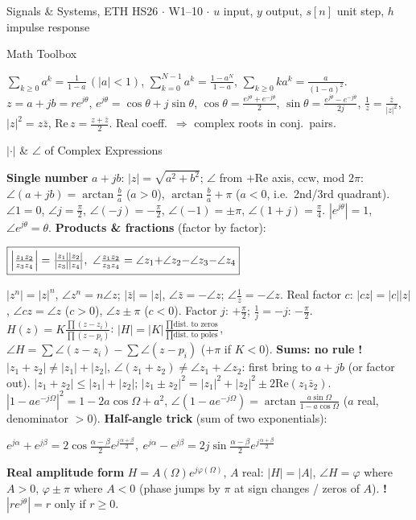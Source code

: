 \documentclass[a4paper,landscape]{article}
\newcommand{\sect}[1]{\par\vspace{1pt}\noindent\colorbox{secblue}{\parbox{\dimexpr\linewidth-2\fboxsep}{\color{white}\bfseries\fontsize{6.8}{7.6}\selectfont\strut #1}}\par\vspace{0.4pt}}
\newcommand{\sub}[1]{\par\vspace{0.6pt}\noindent\colorbox{subblue}{\parbox{\dimexpr\linewidth-2\fboxsep}{\bfseries\strut #1}}\par\vspace{0.2pt}}
\newcommand{\warn}[1]{{\color{warnred}\textbf{!}\,#1}}
\newcommand{\bx}[1]{\fbox{$\textstyle #1$}}
\newcommand{\eqc}[1]{\par\vspace{0.2pt}\centerline{$#1$}\par\vspace{0.2pt}}
\begin{document}
\fontsize{6.5}{7.3}\selectfont\raggedright\setlength{\lineskip}{0.2pt}\setlength{\lineskiplimit}{0pt}
\setlength{\abovedisplayskip}{0.6pt}\setlength{\belowdisplayskip}{0.6pt}
\setlength{\abovedisplayshortskip}{0.3pt}\setlength{\belowdisplayshortskip}{0.3pt}
\setlength{\jot}{0.2pt}
\begin{multicols*}{4}
{\fontsize{5.2}{5.8}\selectfont Signals \& Systems, ETH HS26 $\cdot$ W1--10 $\cdot$ $u$ input, $y$ output, $s[n]$ unit step, $h$ impulse response\par}

\sect{Math Toolbox}
$\sum_{k\ge0}a^k=\frac1{1-a}\,(|a|{<}1)$, $\sum_{k=0}^{N-1}a^k=\frac{1-a^N}{1-a}$, $\sum_{k\ge0}ka^k=\frac{a}{(1-a)^2}$.
$z=a{+}jb=re^{j\theta}$, $e^{j\theta}=\cos\theta+j\sin\theta$, $\cos\theta=\frac{e^{j\theta}+e^{-j\theta}}2$, $\sin\theta=\frac{e^{j\theta}-e^{-j\theta}}{2j}$, $\frac1z=\frac{\bar z}{|z|^2}$, $|z|^2=z\bar z$, $\mathrm{Re}\,z=\frac{z+\bar z}2$. Real coeff.\ $\Rightarrow$ complex roots in conj.\ pairs.
\sub{$|\cdot|$ \& $\angle$ of Complex Expressions}
\textbf{Single number} $a{+}jb$: $|z|=\sqrt{a^2{+}b^2}$; $\angle$ from $+$Re axis, ccw, mod $2\pi$: $\angle(a{+}jb)=\arctan\frac ba$ ($a{>}0$), $\arctan\frac ba{+}\pi$ ($a{<}0$, i.e.\ 2nd/3rd quadrant). $\angle1{=}0$, $\angle j{=}\frac\pi2$, $\angle({-}j){=}{-}\frac\pi2$, $\angle({-}1){=}\pm\pi$, $\angle(1{+}j){=}\frac\pi4$. $|e^{j\theta}|=1$, $\angle e^{j\theta}=\theta$.
\textbf{Products \& fractions} (factor by factor):
\eqc{\bx{\Big|\frac{z_1z_2}{z_3z_4}\Big|=\frac{|z_1||z_2|}{|z_3||z_4|},\ \angle\frac{z_1z_2}{z_3z_4}=\angle z_1{+}\angle z_2{-}\angle z_3{-}\angle z_4}}
$|z^n|=|z|^n$, $\angle z^n=n\angle z$; $|\bar z|=|z|$, $\angle\bar z=-\angle z$; $\angle\frac1z=-\angle z$. Real factor $c$: $|cz|=|c||z|$, $\angle cz=\angle z$ ($c{>}0$), $\angle z\pm\pi$ ($c{<}0$). Factor $j$: $+\frac\pi2$; $\frac1j=-j$: $-\frac\pi2$. $H(z)=K\frac{\prod(z-z_i)}{\prod(z-p_i)}$: $|H|=|K|\frac{\prod\text{dist.\ to zeros}}{\prod\text{dist.\ to poles}}$, $\angle H=\sum\angle(z{-}z_i)-\sum\angle(z{-}p_i)$ (${+}\pi$ if $K{<}0$).
\textbf{Sums: no rule} \warn{$|z_1{+}z_2|\ne|z_1|{+}|z_2|$, $\angle(z_1{+}z_2)\ne\angle z_1{+}\angle z_2$}: first bring to $a{+}jb$ (or factor out). $|z_1{+}z_2|\le|z_1|{+}|z_2|$; $|z_1{\pm}z_2|^2=|z_1|^2{+}|z_2|^2\pm2\mathrm{Re}(z_1\bar z_2)$.
$|1-ae^{-j\Omega}|^2=1-2a\cos\Omega+a^2$, $\angle(1-ae^{-j\Omega})=\arctan\frac{a\sin\Omega}{1-a\cos\Omega}$ ($a$ real, denominator $>0$).
\textbf{Half-angle trick} (sum of two exponentials):
\eqc{e^{j\alpha}{+}e^{j\beta}=2\cos\tfrac{\alpha-\beta}2e^{j\frac{\alpha+\beta}2},\ e^{j\alpha}{-}e^{j\beta}=2j\sin\tfrac{\alpha-\beta}2e^{j\frac{\alpha+\beta}2}}
\textbf{Real amplitude form} $H=A(\Omega)e^{j\varphi(\Omega)}$, $A$ real: $|H|=|A|$, $\angle H=\varphi$ where $A{>}0$, $\varphi\pm\pi$ where $A{<}0$ (phase jumps by $\pi$ at sign changes / zeros of $A$). \warn{$|re^{j\theta}|=r$ only if $r\ge0$.}


\end{multicols*}
\end{document}
